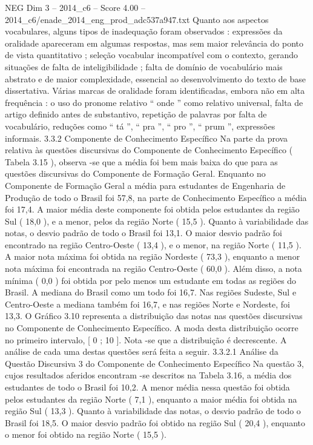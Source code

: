 \begin{textsample}{NEG Dim 3 – 2014\_c6 – Score 4.00 – 2014\_c6/enade\_2014\_eng\_prod\_adc537a947.txt}
Quanto aos aspectos vocabulares, alguns tipos de inadequação foram observados : expressões da oralidade apareceram em algumas respostas, mas sem maior relevância do ponto de vista quantitativo ; seleção vocabular incompatível com o contexto, gerando situações de falta de inteligibilidade ; falta de domínio de vocabulário mais abstrato e de maior complexidade, essencial ao desenvolvimento do texto de base dissertativa.
Várias marcas de oralidade foram identificadas, embora não em alta frequência : o uso do pronome relativo “ onde ” como relativo universal, falta de artigo definido antes de substantivo, repetição de palavras por falta de vocabulário, reduções como “ tá ”, “ pra ”, “ pro ”, “ prum ”, expressões informais. 3.3.2 Componente de Conhecimento Específico Na parte da prova relativa às questões discursivas do Componente de Conhecimento Específico ( Tabela 3.15 ), observa -se que a média foi bem mais baixa do que para as questões discursivas do Componente de Formação Geral.
Enquanto no Componente de Formação Geral a média para estudantes de Engenharia de Produção de todo o Brasil foi 57,8, na parte de Conhecimento Específico a média foi 17,4.
A maior média deste componente foi obtida pelos estudantes da região Sul ( 18,0 ), e a menor, pelos da região Norte ( 15,5 ).
Quanto à variabilidade das notas, o desvio padrão de todo o Brasil foi 13,1.
O maior desvio padrão foi encontrado na região Centro-Oeste ( 13,4 ), e o menor, na região Norte ( 11,5 ).
A maior nota máxima foi obtida na região Nordeste ( 73,3 ), enquanto a menor nota máxima foi encontrada na região Centro-Oeste ( 60,0 ).
Além disso, a nota mínima ( 0,0 ) foi obtida por pelo menos um estudante em todas as regiões do Brasil.
A mediana do Brasil como um todo foi 16,7.
Nas regiões Sudeste, Sul e Centro-Oeste a mediana também foi 16,7, e nas regiões Norte e Nordeste, foi 13,3.
O Gráfico 3.10 representa a distribuição das notas nas questões discursivas no Componente de Conhecimento Específico.
A moda desta distribuição ocorre no primeiro intervalo, [ 0 ; 10 ].
Nota -se que a distribuição é decrescente.
A análise de cada uma destas questões será feita a seguir. 3.3.2.1 Análise da Questão Discursiva 3 do Componente de Conhecimento Específico Na questão 3, cujos resultados aferidos encontram -se descritos na Tabela 3.16, a média dos estudantes de todo o Brasil foi 10,2.
A menor média nessa questão foi obtida pelos estudantes da região Norte ( 7,1 ), enquanto a maior média foi obtida na região Sul ( 13,3 ).
Quanto à variabilidade das notas, o desvio padrão de todo o Brasil foi 18,5.
O maior desvio padrão foi obtido na região Sul ( 20,4 ), enquanto o menor foi obtido na região Norte ( 15,5 ).

\end{textsample}
